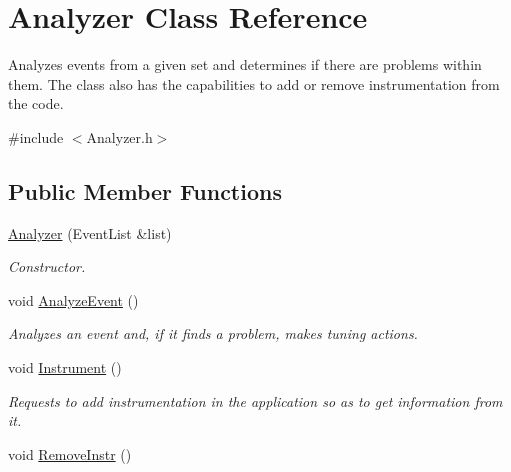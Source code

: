 \hypertarget{class_analyzer}{\section{Analyzer Class Reference}
\label{class_analyzer}
}


Analyzes events from a given set and determines if there are problems within them. The class also has the capabilities to add or remove instrumentation from the code.  




{\ttfamily \#include $<$Analyzer.\-h$>$}

\subsection*{Public Member Functions}
\begin{DoxyCompactItemize}
\item 
\hyperlink{class_analyzer_a297d271be87a5119ccc5963da55d3e69}{Analyzer} (Event\-List \&list)
\begin{DoxyCompactList}\small\item\em Constructor. \end{DoxyCompactList}\item 
\hypertarget{class_analyzer_a7186b1dd005cea7f0c3de1d74da00184}{void \hyperlink{class_analyzer_a7186b1dd005cea7f0c3de1d74da00184}{Analyze\-Event} ()}\label{class_analyzer_a7186b1dd005cea7f0c3de1d74da00184}

\begin{DoxyCompactList}\small\item\em Analyzes an event and, if it finds a problem, makes tuning actions. \end{DoxyCompactList}\item 
\hypertarget{class_analyzer_a74273bc7c5f368bbf1fcf748d68b0462}{void \hyperlink{class_analyzer_a74273bc7c5f368bbf1fcf748d68b0462}{Instrument} ()}\label{class_analyzer_a74273bc7c5f368bbf1fcf748d68b0462}

\begin{DoxyCompactList}\small\item\em Requests to add instrumentation in the application so as to get information from it. \end{DoxyCompactList}\item 
\hypertarget{class_analyzer_a6c8d3c336db431f01ce2cfd0d4546af8}{void \hyperlink{class_analyzer_a6c8d3c336db431f01ce2cfd0d4546af8}{Remove\-Instr} ()}\label{class_analyzer_a6c8d3c336db431f01ce2cfd0d4546af8}


\end{DoxyCompactItemize}
